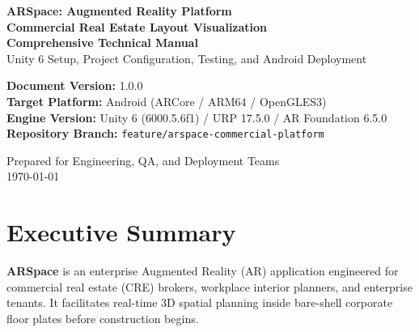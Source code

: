 \documentclass[11pt,a4paper]{article}
\begin{document}
\begin{titlepage}
    \centering
    \vspace*{1.5cm}
    
    {\Huge\bfseries\color{primaryblue} ARSpace: Augmented Reality Platform}\\[0.4cm]
    {\LARGE\bfseries Commercial Real Estate Layout Visualization}\\[1.5cm]
    
    \textbf{\Large Comprehensive Technical Manual}\\[0.3cm]
    {\large Unity 6 Setup, Project Configuration, Testing, and Android Deployment}\\[2cm]
    
    \begin{tcolorbox}[colback=lightgray,colframe=primaryblue,width=0.9\textwidth,arc=4mm]
        \centering
        \textbf{Document Version:} 1.0.0 \\
        \textbf{Target Platform:} Android (ARCore / ARM64 / OpenGLES3) \\
        \textbf{Engine Version:} Unity 6 (6000.5.6f1) / URP 17.5.0 / AR Foundation 6.5.0 \\
        \textbf{Repository Branch:} \texttt{feature/arspace-commercial-platform}
    \end{tcolorbox}
    
    \vfill
    {\large Prepared for Engineering, QA, and Deployment Teams}\\[0.5cm]
    {\large \today}
\end{titlepage}

\tableofcontents
\newpage

\section{Executive Summary}
\textbf{ARSpace} is an enterprise Augmented Reality (AR) application engineered for commercial real estate (CRE) brokers, workplace interior planners, and enterprise tenants. It facilitates real-time 3D spatial planning inside bare-shell corporate floor plates before construction begins.
\end{document}
